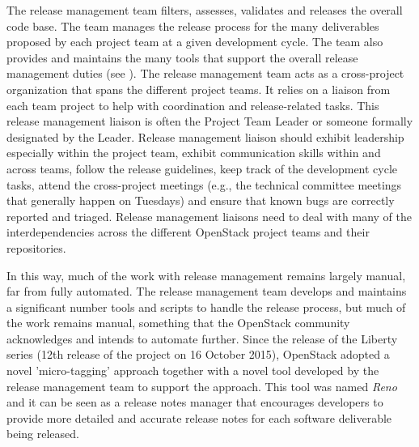 \documentclass[dvipsnames]{bmcart}
\theoremstyle{definition}
\begin{document}
The release management team filters, assesses, validates and releases the overall code base. The team manages the release process for the many deliverables proposed by each project team at a given development cycle. The team also provides and maintains the many tools that support the overall release management duties (see ). The release management team acts as a cross-project organization that spans the different project teams. It relies on a liaison from each team project to help with coordination and release-related tasks. This release management liaison is often the Project Team Leader or someone formally designated by the Leader. Release management liaison should exhibit leadership especially within the project team, exhibit communication skills within and across teams, follow the release guidelines, keep track of the development cycle tasks, attend the cross-project meetings (e.g., the technical committee meetings that generally happen on Tuesdays) and ensure that known bugs are correctly reported and triaged. Release management liaisons need to deal with many of the interdependencies across the different OpenStack project teams and their repositories.

In this way, much of the work with release management remains largely manual, far from fully automated. The release management team develops and maintains a significant number tools and scripts to handle the release process, but much of the work remains manual, something that the OpenStack community acknowledges and intends to  automate further. Since the release of the Liberty series (12th release of the project on 16 October 2015), OpenStack adopted a novel 'micro-tagging' approach together with a novel tool developed by the release management team to support the approach. This tool was named \textit{Reno} and it can be seen as a release notes manager that encourages developers to provide more detailed and accurate release notes for each software deliverable being released.

\end{document}
